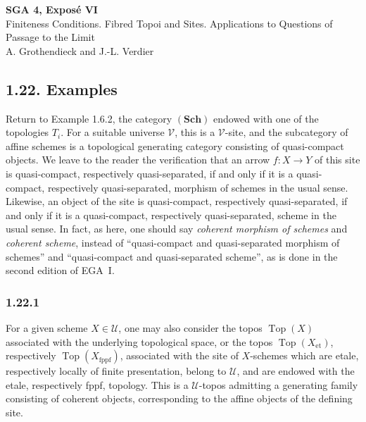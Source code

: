\documentclass[11pt]{article}
\newcommand{\U}{\mathcal{U}}
\newcommand{\V}{\mathcal{V}}
\newcommand{\Sch}{\mathbf{Sch}}
\newcommand{\Top}{\operatorname{Top}}
\newcommand{\EGA}{EGA}
\begin{document}

\begin{center}
{\Large \textbf{SGA 4, Expos\'e VI}}\\[0.35em]
{\large Finiteness Conditions. Fibred Topoi and Sites. Applications to Questions of Passage to the Limit}\\[0.25em]
{\normalsize A. Grothendieck and J.-L. Verdier}
\end{center}

\bigskip

\subsection*{1.22. Examples}

Return to Example 1.6.2, the category \((\Sch)\) endowed with one of the topologies \(T_i\). For a suitable universe \(\V\), this is a \(\V\)-site, and the subcategory of affine schemes is a topological generating category consisting of quasi-compact objects. We leave to the reader the verification that an arrow \(f:X\to Y\) of this site is quasi-compact, respectively quasi-separated, if and only if it is a quasi-compact, respectively quasi-separated, morphism of schemes in the usual sense. Likewise, an object of the site is quasi-compact, respectively quasi-separated, if and only if it is a quasi-compact, respectively quasi-separated, scheme in the usual sense. In fact, as here, one should say \emph{coherent morphism of schemes} and \emph{coherent scheme}, instead of ``quasi-compact and quasi-separated morphism of schemes'' and ``quasi-compact and quasi-separated scheme'', as is done in the second edition of \EGA~I.

\subsubsection*{1.22.1}
For a given scheme \(X\in\U\), one may also consider the topos \(\Top(X)\) associated with the underlying topological space, or the topos \(\Top(X_{\mathrm{et}})\), respectively \(\Top(X_{\mathrm{fppf}})\), associated with the site of \(X\)-schemes which are etale, respectively locally of finite presentation, belong to \(\U\), and are endowed with the etale, respectively fppf, topology. This is a \(\U\)-topos admitting a generating family consisting of coherent objects, corresponding to the affine objects of the defining site.
\end{document}
